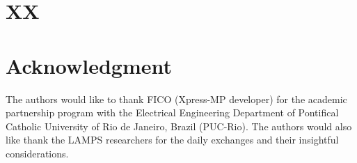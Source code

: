 \documentclass[a4paper]{IEEEtran}
\begin{document}

\section{XX}


\section*{Acknowledgment}

The authors would like to thank FICO (Xpress-MP developer) for the academic partnership program with the Electrical Engineering Department of Pontifical Catholic University of Rio de Janeiro, Brazil (PUC-Rio). The authors would also like thank the LAMPS researchers for the daily exchanges and their insightful considerations.







\end{document}
